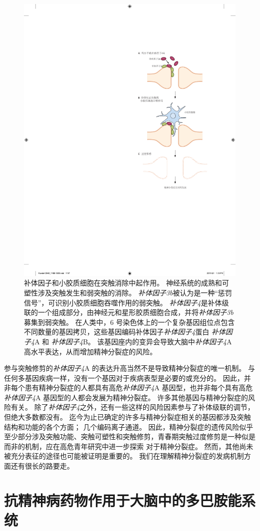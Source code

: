 \begin{figure}[htbp]
	\centering
	\includegraphics[width=0.6\linewidth]{chap60/fig_60_7}
	\caption{补体因子和小胶质细胞在突触消除中起作用。
		神经系统的成熟和可塑性涉及突触发生和弱突触的消除。
		\textit{补体因子3b}被认为是一种“惩罚信号”，可识别小胶质细胞吞噬作用的弱突触。
		\textit{补体因子4}是补体级联的一个组成部分，由神经元和星形胶质细胞合成，并将\textit{补体因子3b}募集到弱突触。
		在人类中，6 号染色体上的一个复杂基因组位点包含不同数量的基因拷贝，这些基因编码补体因子\textit{补体因子4}蛋白 \textit{补体因子4}A 和 \textit{补体因子4}B。
		该基因座内的变异会导致大脑中\textit{补体因子4}A 高水平表达，从而增加精神分裂症的风险。}
	\label{fig:60_7}
\end{figure}


参与突触修剪的\textit{补体因子4}A 的表达升高当然不是导致精神分裂症的唯一机制。
与任何多基因疾病一样，没有一个基因对于疾病表型是必要的或充分的。
因此，并非每个患有精神分裂症的人都具有高危\textit{补体因子4}A 基因型，也并非每个具有高危\textit{补体因子4}A 基因型的人都会发展为精神分裂症。 许多其他基因与精神分裂症的风险有关。
除了\textit{补体因子4}之外，还有一些这样的风险因素参与了补体级联的调节，但绝大多数都没有。
迄今为止已确定的许多与精神分裂症相关的基因都涉及突触结构和功能的各个方面；
几个编码离子通道。
因此，精神分裂症的遗传风险似乎至少部分涉及突触功能、突触可塑性和突触修剪，青春期突触过度修剪是一种似是而非的机制，应在高危青年研究中进一步探索 对于精神分裂症。
然而，其他尚未被充分表征的途径也可能被证明是重要的。
我们在理解精神分裂症的发病机制方面还有很长的路要走。



\section{抗精神病药物作用于大脑中的多巴胺能系统}

